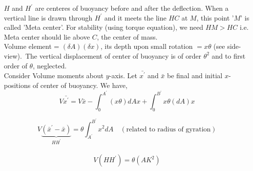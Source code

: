 \documentclass[11pt,a4paper]{scrartcl}
\begin{document}
\begin{solution}
\begin{center}
\begin{tikzpicture}[x=0.75pt,y=0.75pt,yscale=-1,xscale=1]
\end{tikzpicture}
\end{center}

$H$ and $H^{\prime}$ are centeres of buoyancy before and after the deflection. When a vertical line is drawn through $H^{\prime}$ and it meets the line $HC$ at $M$, this point '$M$' is called 'Meta center'. For stability (using torque equation), we need $HM>HC$ i.e. Meta center should lie above $C$, the center of mass. \\

Volume element = $(\delta A)(\delta x)$, its depth upon small rotation $=x \theta$ (see side-view).\
The vertical displacement of center of buoyancy is of order $\theta^2$ and to first order of $\theta$, neglected. \\

 Consider Volume moments about $y$-axis. Let $\bar{x^{\prime}}$ and $\bar{x}$ be final and initial $x$-positions of center of buoyancy. We have,
 $$V \bar{x^{\prime}}= V \bar{x} - \int_{0}^{A^{\prime}}(x \theta) dA x +\int_{0}^{B^{\prime}} x \theta (dA) x$$


$$V \underbrace{\left(\bar{x}^{\prime}-\bar{x}\right)}_{{HH^{\prime}}}=\theta \int_{A^{\prime}}^{B^{\prime}} x^{2} d A  \quad   (\text{related to radius of gyration})$$ \\

$$V(HH^{\prime})=\theta(AK^2)$$\\

\begin{center}

\begin{tikzpicture}[x=0.75pt,y=0.75pt,yscale=-1,xscale=1]


\end{tikzpicture}
\end{center}
\end{solution}
\end{document}
